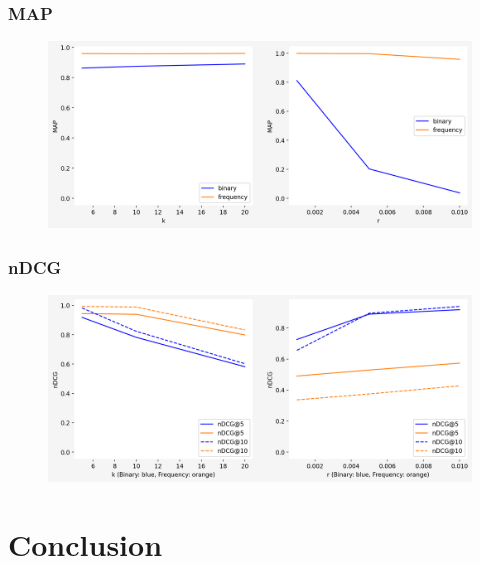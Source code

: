 \documentclass{beamer}
\begin{document}
\begin{frame}
\frametitle{MAP} 
\begin{block}{} \vspace{-1cm}
\begin{figure}[h] 
\includegraphics[width=1 \textwidth]{MAP-Geolife}
\end{figure}
\end{block}
\end{frame}


\begin{frame}
\frametitle{nDCG} 
\begin{block}{} \vspace{-1cm}
\begin{figure}[h] 
\includegraphics[width=1 \textwidth]{nDCG-Geolife} 
\end{figure}
\end{block}
\end{frame}




\section{Conclusion}
\end{document}

